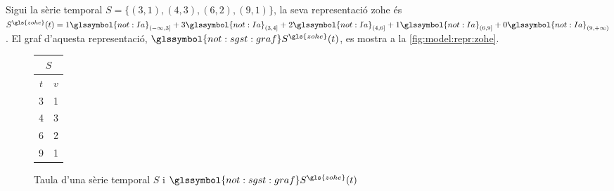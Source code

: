\begin{example}
  Sigui la sèrie temporal $S=\{ (3,1), (4,3), (6,2), (9,1) \}$, la
  seva representació \gls{zohe} és $S^{\gls{zohe}}(t) =
  1\glssymbol{not:Ia}_{(-\infty,3]} +3\glssymbol{not:Ia}_{(3,4]}
  +2\glssymbol{not:Ia}_{(4,6]} +1\glssymbol{not:Ia}_{(6,9]}
  +0\glssymbol{not:Ia}_{(9,+\infty)}$. El graf d'aquesta
  representació, $\glssymbol{not:sgst:graf} S^{\gls{zohe}}(t)$, es
  mostra a la \autoref{fig:model:repr:zohe}.


  \begin{figure}[tp]
  \centering
  \begin{tabular}[c]{|c|c|}
    \multicolumn{2}{c}{$S$} \\ \hline
    $t$  & $v$ \\ \hline
    3  & 1 \\
    4  & 3 \\
    6  & 2 \\
    9  & 1 \\ \hline
  \end{tabular} \qquad
   \caption{Taula d'una sèrie temporal $S$ i
     $\glssymbol{not:sgst:graf} S^{\gls{zohe}}(t)$}
  \label{fig:model:repr:zohe}
  \end{figure}
\end{example}



